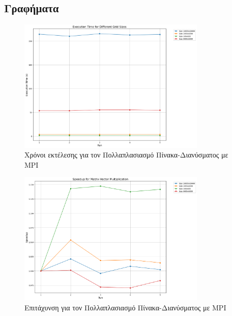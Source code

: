 \documentclass{article}
\begin{document}
\subsection*{Γραφήματα}
\newpage
\begin{figure}[h]
    \centering
    \includegraphics[width=0.8\textwidth]{matrix_vector_mpi_results.png}
    \caption{Χρόνοι εκτέλεσης για τον Πολλαπλασιασμό Πίνακα-Διανύσματος με MPI}
\end{figure}
\begin{figure}[h]
    \centering
    \includegraphics[width=0.8\textwidth]{matrix_vector_multiplication_speedup.png}
    \caption{Επιτάχυνση για τον Πολλαπλασιασμό Πίνακα-Διανύσματος με MPI}
\end{figure}
\newpage
\end{document}
